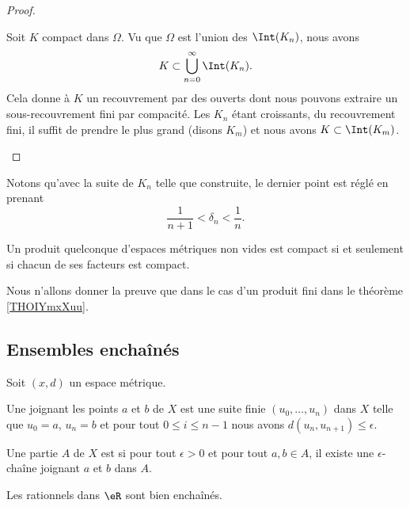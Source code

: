 \begin{proof}
\begin{enumerate}
            Soit \( K\) compact dans \( \Omega\). Vu que \( \Omega\) est l'union des \( \Int(K_n)\), nous avons
            \begin{equation}
                K\subset\bigcup_{n=0}^{\infty}\Int(K_n).
            \end{equation}
            Cela donne à \( K\) un recouvrement par des ouverts dont nous pouvons extraire un sous-recouvrement fini par compacité. Les \( K_n\) étant croissants, du recouvrement fini, il suffit de prendre le plus grand (disons \( K_m\)) et nous avons \( K\subset\Int(K_m)\).

    \end{enumerate}
\end{proof}
Notons qu'avec la suite de \( K_n\) telle que construite, le dernier point est réglé en prenant
\begin{equation}
    \frac{1}{ n+1 }<\delta_n<\frac{1}{ n }.
\end{equation}


\begin{theorem}[Tykhonov]\label{ThoFWXsQOZ}
    Un produit quelconque d'espaces métriques non vides est compact si et seulement si chacun de ses facteurs est compact.
\end{theorem}
Nous n'allons donner la preuve que dans le cas d'un produit fini dans le théorème \ref{THOIYmxXuu}.

\subsection{Ensembles enchaînés}

Soit \( (x,d)\) un espace métrique.
\begin{definition}
    Une  joignant les points \( a\) et \( b\) de \( X\) est une suite finie \( (u_0,\ldots, u_n)\) dans \( X\) telle que \( u_0=a\), \( u_n=b\) et pour tout \( 0\leq i\leq n-1\) nous avons \( d(u_n,u_{n+1})\leq \epsilon\).

    Une partie \( A\) de \( X\) est  si pour tout \( \epsilon>0\) et pour tout \( a,b\in A\), il existe une \( \epsilon\)-chaîne joignant \( a\) et \( b\) dans $A$.
\end{definition}
Les rationnels dans \( \eR\) sont bien enchaînés.

